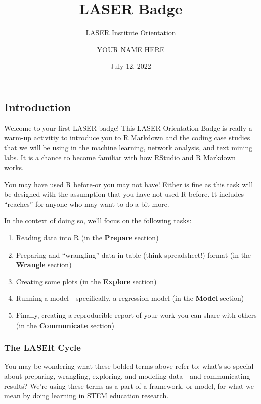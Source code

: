 \documentclass[
]{article}
\title{LASER Badge}
\subtitle{LASER Institute Orientation}
\author{YOUR NAME HERE}
\date{July 12, 2022}
\providecommand{\tightlist}{%
  \setlength{\itemsep}{0pt}\setlength{\parskip}{0pt}}
\begin{document}
\maketitle

{
\setcounter{tocdepth}{4}
\tableofcontents
}
\hypertarget{introduction}{%
\subsection{Introduction}\label{introduction}}

Welcome to your first LASER badge! This LASER Orientation Badge is
really a warm-up activitiy to introduce you to R Markdown and the coding
case studies that we will be using in the machine learning, network
analysis, and text mining labs. It is a chance to become familiar with
how RStudio and R Markdown works.

You may have used R before-or you may not have! Either is fine as this
task will be designed with the assumption that you have not used R
before. It includes ``reaches'' for anyone who may want to do a bit
more.

In the context of doing so, we'll focus on the following tasks:

\begin{enumerate}
\def\labelenumi{\arabic{enumi}.}
\tightlist
\item
  Reading data into R (in the \textbf{Prepare} section)
\item
  Preparing and ``wrangling'' data in table (think spreadsheet!) format
  (in the \textbf{Wrangle} section)
\item
  Creating some plots (in the \textbf{Explore} section)
\item
  Running a model - specifically, a regression model (in the
  \textbf{Model} section)
\item
  Finally, creating a reproducible report of your work you can share
  with others (in the \textbf{Communicate} section)
\end{enumerate}

\hypertarget{the-laser-cycle}{%
\subsubsection{The LASER Cycle}\label{the-laser-cycle}}

You may be wondering what these bolded terms above refer to; what's so
special about preparing, wrangling, exploring, and modeling data - and
communicating results? We're using these terms as a part of a framework,
or model, for what we mean by doing learning in STEM education research.
\end{document}
